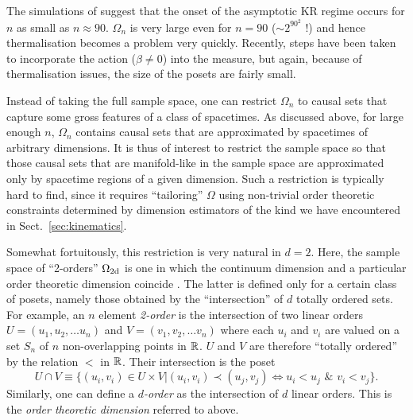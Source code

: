 The simulations of \cite{onset} suggest that the onset of the asymptotic  KR regime occurs for $n$ as small as $n
\approx 90$.  $\Omega_n$ is very large even for $n=90$ ($\sim 2^{90^2}$ !) and hence thermalisation  becomes  a problem
very quickly. 
Recently, steps have been taken to incorporate the action ($\beta \neq 0$)  into the measure, but again, because of
thermalisation issues, the size of the posets are fairly small. 

Instead of taking the full sample space, one can restrict $\Omega_n$ to causal sets that capture some gross features of
a class of spacetimes. As discussed above, for large enough $n$,  $\Omega_n$ contains causal sets that are approximated
by spacetimes of arbitrary dimensions. It is thus of interest to restrict the sample space so that those causal sets
that are  manifold-like in the sample space are approximated only by spacetime regions of a given dimension. Such a
restriction is typically hard to find, since it requires ``tailoring'' $\Omega$ using non-trivial order theoretic
constraints determined by dimension estimators of the kind we have encountered in Sect.~\ref{sec:kinematics}.  

Somewhat fortuitously, this restriction is very natural in $d=2$. Here, the sample space of  ``{2-orders}''
$\Omega_{\mathrm{2d}}$  is one in which the continuum dimension and a particular  order
theoretic dimension coincide \citep{2dorders,es,winkler}. The latter is defined only for a certain class of posets,
namely those obtained by the ``intersection''  of  $d$ totally ordered sets. For example,  an  $n$ element   \emph{2-order} is the
intersection of two linear orders $U=(u_1, u_2, \ldots u_n)$ and $V= (v_1, v_2, \ldots v_n)$ where each $u_i$ and $ v_i$
are valued on a set $S_n$ of $n$ non-overlapping points in $\mathbb R$. 
$U$ and $V$ are  therefore ``totally  ordered''  by the relation $<$ in $\mathbb R$. Their  intersection is the poset 
\begin{equation}
  U\cap V \equiv \{(u_i,v_i) \in U \times V |  (u_i,v_i)\prec (u_j,v_j)  \Leftrightarrow u_i < u_j \, \, \& \, \, v_i<v_j\}.
\end{equation} 
Similarly, one can define a \emph{$d$-order} as the intersection of $d$ linear orders. This is the  \emph{order theoretic
  dimension} referred to above.


